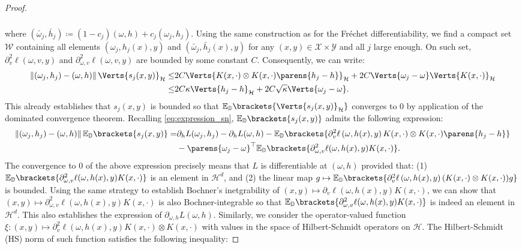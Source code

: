 \begin{proof}
\begin{align*}
\begin{split}
    \end{split}
\end{align*}
where $(\bar{\omega}_j,\bar{h}_j)\coloneqq (1-c_j)(\omega,h) + c_j(\omega_j,h_j)$. Using the same construction as for the Fr\'echet differentiability, we find a compact set $\mathcal{W}$ containing all elements $(\omega_j,h_j(x),y)$ and $(\bar{\omega}_j,\bar{h}_j(x),y)$ for any $(x,y)\in \mathcal{X}\times \mathcal{Y}$ and all $j$ large enough. On such set, $\partial_v^2\ell(\omega,v,y)$ and $\partial_{\omega,v}^2\ell(\omega,v,y)$ are bounded by some constant $C$. Consequently, we can write:
\begin{align*}
    \begin{split}
\left\|(\omega_j,h_j)-(\omega,h)\right\|\Verts{s_j(x,y)}_{\mathcal{H}} \leq & 2C\Verts{K(x,\cdot)\otimes K(x,\cdot)\parens{h_j-h}}_{\mathcal{H}}
+ 2C\Verts{\omega_j-\omega} \Verts{K(x,\cdot)}_{\mathcal{H}}\\
\leq & 2C \kappa\Verts{h_j-h}_{\mathcal{H}} + 2C\sqrt{\kappa}\Verts{\omega_j-\omega}.
    \end{split}
\end{align*}
This already establishes that $s_j(x,y)$ is bounded so that $\mathbb{E}_{\PP}\brackets{\Verts{s_j(x,y)}_{\mathcal{H}}}$ converges to $0$ by application of the dominated convergence theorem. Recalling \cref{eq:expression_sn},  $\mathbb{E}_{\mathbb{\PP}}\brackets{s_j(x,y)}$ admits the following expression:
	\begin{align*}
\begin{split}
\left\|(\omega_j,h_j)-(\omega,h)\right\|\mathbb{E}_{\mathbb{\PP}}\brackets{s_j(x,y)}= &\partial_h L(\omega_j,h_j)-\partial_h L(\omega,h)
-\mathbb{E}_{\mathbb{\PP}}\brackets{\partial_v^2\ell\left(\omega,h(x),y\right)K(x,\cdot)\otimes K(x,\cdot)\parens{h_j-h}}\\
&- \parens{\omega_j-\omega}^{\top}\mathbb{E}_{\mathbb{\PP}}\brackets{ \partial_{\omega,v}^2\ell(\omega,h(x),y)K(x,\cdot)}.
    \end{split}	\end{align*}
	The convergence to $0$ of the above expression precisely means that $L$ is differentiable at $(\omega,h)$ provided that: (1) $\mathbb{E}_{\mathbb{\PP}}\brackets{ \partial_{\omega,v}^2\ell(\omega,h(x),y)K(x,\cdot)}$ is an element in $\mathcal{H}^d$, and (2) the linear map   $g\mapsto\mathbb{E}_{\PP}\brackets{\partial_v^2\ell\left(\omega,h(x),y\right)(K(x,\cdot)\otimes K(x,\cdot))g}$ is bounded. Using the same strategy to establish Bochner's inetgrability of $(x,y)\mapsto \partial_v\ell\left(\omega,h(x),y\right)K(x,\cdot)$, we can show that $(x,y)\mapsto \partial_{\omega,v}^2\ell\left(\omega,h(x),y\right)K(x,\cdot)$ is also Bochner-integrable so that $\mathbb{E}_{\mathbb{\PP}}\brackets{ \partial_{\omega,v}^2\ell(\omega,h(x),y)K(x,\cdot)}$ is indeed an element in $\mathcal{H}^d$. This also establishes the expression of $\partial_{\omega,h}L(\omega,h)$. Similarly, we consider the operator-valued function $\xi:(x,y)\mapsto \partial_{v}^2\ell\left(\omega,h(x),y\right)K(x,\cdot)\otimes K(x,\cdot)$ with values in the space of Hilbert-Schmidt operators on $\mathcal{H}$. The Hilbert-Schmidt (HS) norm of such function satisfies the following inequality:

\end{proof}
